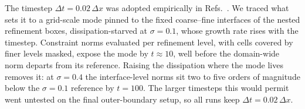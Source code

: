 \documentclass[twocolumn,floatfix,aps,prd,superscriptaddress,nofootinbib]{revtex4-2}
\begin{document}
The timestep $\Delta t=0.02\,\Delta x$ was adopted empirically in Refs.~\cite{shirokov2026,shirokov2026c}. We traced what sets it to a grid-scale mode pinned to the fixed coarse--fine interfaces of the nested refinement boxes, dissipation-starved at $\sigma=0.1$, whose growth rate rises with the timestep. Constraint norms evaluated per refinement level, with cells covered by finer levels masked, expose the mode by $t\approx10$, well before the domain-wide norm departs from its reference. Raising the dissipation where the mode lives removes it: at $\sigma=0.4$ the interface-level norms sit two to five orders of magnitude below the $\sigma=0.1$ reference by $t=100$. The larger timesteps this would permit went untested on the final outer-boundary setup, so all runs keep $\Delta t=0.02\,\Delta x$.

\FloatBarrier
\end{document}
